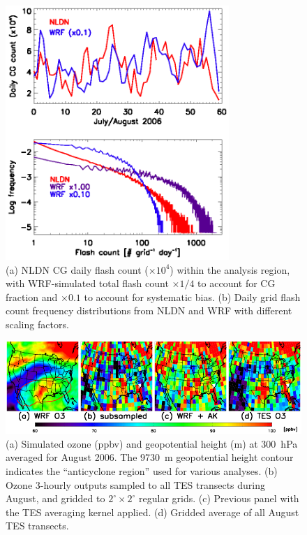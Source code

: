  \begin{figure}
 \noindent\includegraphics[width=20pc]{figures/ltng_dist.eps} %
 \caption{(a) NLDN CG daily flash count ($\times10^4$) within the analysis region, with
WRF-simulated total flash count $\times1/4$ to account for CG fraction and $\times0.1$
to account for systematic bias. (b) Daily grid flash count frequency distributions from
NLDN and WRF with different scaling factors.}
 \label{fig:lightning}
 \end{figure}

 \begin{figure}
 \noindent\includegraphics[width=40pc]{figures/o3/tes08_o3.png}
 \caption{(a) Simulated ozone (ppbv) and geopotential height (m) at 300~hPa averaged for August
2006. The 9730~m geopotential height contour indicates the ``anticyclone region'' used for
various analyses. (b) Ozone 3-hourly outputs sampled to all TES transects during August, and gridded
to $2^\circ\times2^\circ$ regular grids. (c) Previous panel with the TES averaging kernel applied.
(d) Gridded average of all August TES transects.}
 \label{fig:o3_map}
 \end{figure}

